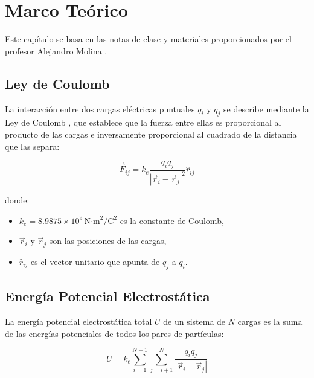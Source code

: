 
\chapter{Marco Teórico}
\label{cap:marco_teorico}

Este capítulo se basa en las notas de clase y materiales proporcionados por el profesor Alejandro Molina \cite{carga-molina2024,potencial-molina2024,campo-molina2024,proyecto-molina2024}.

\section{Ley de Coulomb}
La interacción entre dos cargas eléctricas puntuales \(q_i\) y \(q_j\) se describe mediante la Ley de Coulomb \cite{carga-molina2024}, que establece que la fuerza entre ellas es proporcional al producto de las cargas e inversamente proporcional al cuadrado de la distancia que las separa:

\begin{equation}
    \vec{F}_{ij} = k_e \frac{q_i q_j}{|\vec{r}_i - \vec{r}_j|^2} \hat{r}_{ij}
\end{equation}

donde:
\begin{itemize}
    \item \(k_e = 8.9875 \times 10^9 \, \text{N·m}^2/\text{C}^2\) es la constante de Coulomb,
    \item \(\vec{r}_i\) y \(\vec{r}_j\) son las posiciones de las cargas,
    \item \(\hat{r}_{ij}\) es el vector unitario que apunta de \(q_j\) a \(q_i\).
\end{itemize}

\section{Energía Potencial Electrostática}
La energía potencial electrostática total \(U\) de un sistema de \(N\) cargas es la suma de las energías potenciales de todos los pares de partículas:

\begin{equation}
    U = k_e \sum_{i=1}^{N-1} \sum_{j=i+1}^N \frac{q_i q_j}{|\vec{r}_i - \vec{r}_j|}
    \label{eq:energia_total}
\end{equation}


